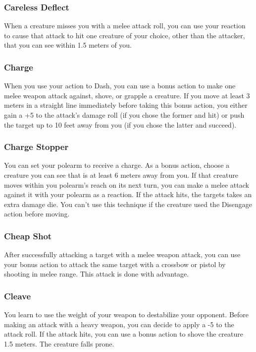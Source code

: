 \subsubsection{Careless Deflect} \label{tec::carelessdeflect}
When a creature misses you with a melee attack roll, you can use your reaction to cause that attack to hit one creature of your choice, other than the attacker, that you can see within 1.5 meters of you.

\subsubsection{Charge} \label{tec::charge}
When you use your action to Dash, you can use a bonus action to make one melee weapon attack against, shove, or grapple a creature.
If you move at least 3 meters in a straight line immediately before taking this bonus action, you either gain a +5 to the attack's damage roll (if you chose the former and hit) or push the target up to 10 feet away from you (if you chose the latter and succeed).

\subsubsection{Charge Stopper} \label{tec::chargestopper}
You can set your polearm to receive a charge.
As a bonus action, choose a creature you can see that is at least 6 meters away from you.
If that creature moves within you polearm's reach on its next turn, you can make a melee attack against it with your polearm as a reaction.
If the attack hits, the targets takes an extra damage die.
You can't use this technique if the creature used the Disengage action before moving.

\subsubsection{Cheap Shot} \label{tec::cheapshot}
After successfully attacking a target with a melee weapon attack, you can use your bonus action to attack the same target with a crossbow or pistol by shooting in melee range.
This attack is done with advantage.

\subsubsection{Cleave} \label{tec::cleave}
You learn to use the weight of your weapon to destabilize your opponent.
Before making an attack with a heavy weapon, you can decide to apply a -5 to the attack roll.
If the attack hits, you can use a bonus action to shove the creature 1.5 meters.
The creature falls prone.

